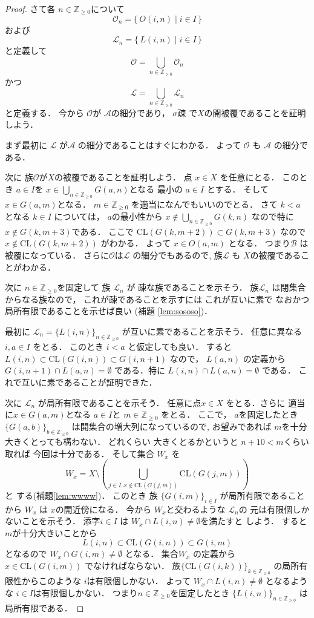 \documentclass[leqno, a4paper, 12pt]{jsarticle}
\newcommand{\zz}{\mathbb{Z}}
\newcommand{\cl}{\mathrm{CL}}
\begin{document}
\begin{proof}
さて各
$n\in \zz_{\ge 0}$について
\[
\mathcal{O}_{n}=\{\, O(i, n)\mid i\in I\, \}
\]
および
\[
\mathcal{L}_{n}=\{\, L(i, n)\mid i\in I\, \}
\]
と定義して
\[
\mathcal{O}=\bigcup_{n\in \zz_{\ge 0}}\mathcal{O}_{n}
\]
かつ
\[
\mathcal{L}=\bigcup_{n\in \zz_{\ge 0}}\mathcal{L}_{n}
\]
と定義する．
今から
$\mathcal{O}$が
$\mathcal{A}$の細分であり，
$\sigma$疎
で$X$の開被覆であることを証明しよう．

まず最初に
$\mathcal{L}$
が$\mathcal{A}$
の細分であることはすぐにわかる．
よって
$\mathcal{O}$
も
$\mathcal{A}$
の細分である．

次に
族$\mathcal{O}$が$X$の被覆であることを証明しよう．
点
$x\in X$
を任意にとる．
このとき
$a\in I$を
$x\in \bigcup_{n\in \zz_{\ge 0}}G(a, n)$となる
最小の
$a\in I$
とする．
そして
$x\in G(a, m)$となる．
$m\in \zz_{\ge 0}$
を適当になんでもいいのでとる．
さて
$k<a$
となる
$k\in I$
については，
$a$の最小性から
$x\not\in \bigcup_{n\in \zz_{\ge 0}}G(k, n)$
なので特に
$x\not \in G(k, m+3)$である．
ここで
$\cl(G(k, m+2))\subset G(k, m+3)$
なので
$x\not \in \cl(G(k, m+2))$
がわかる．
よって
$x\in O(a, m)$
となる．
つまり$\mathcal{B}$
は被覆になっている．
さらに$\mathcal{O}$は$\mathcal{L}$
の細分でもあるので,
族$\mathcal{L}$
も
$X$の被覆であることがわかる．

次に
$n\in \zz_{\ge 0}$を固定して
族
$\mathcal{L}_{n}$
が
疎な族であることを示そう．
族$\mathcal{L}_{n}$
は閉集合からなる族なので，
これが疎であることを示すには
これが互いに素で
なおかつ
局所有限であることを示せば良い
(補題
\ref{lem:sososo})．

最初に
$\mathcal{L}_{n}=\{L(i, n)\}_{n\in \zz_{\ge 0}}$
が互いに素であることを示そう．
任意に異なる
$i, a\in I$
をとる．
このとき
$i<a$
と仮定しても良い．
すると
$L(i, n)\subset \cl(G(i, n)) \subset G(i, n+1)$
なので，
$L(a, n)$
の定義から
$G(i, n+1)\cap L(a, n)=\emptyset$
である．特に
$L(i, n)\cap L(a, n)=\emptyset$
である．
これで互いに素であることが証明できた．

次に
$\mathcal{L}_{n}$
が局所有限であることを示そう．
任意に点$x\in X$
をとる．さらに
適当に$x\in G(a, m)$となる
$a\in I$と
$m\in \zz_{\ge 0}$
をとる．
ここで，
$a$を固定したとき
$\{G(a, b)\}_{b\in \zz_{\ge 0}}$
は開集合の増大列になっているので,
お望みであれば
$m$を十分大きくとっても構わない．
どれくらい
大きくとるかというと
$n+10<m$くらい取れば
今回は十分である．
そして集合
$W_{x}$
を
\[
W_{x}=X\setminus \left(\bigcup_{j\in I, x\not\in \cl(G(j, m))}
\cl(G(j, m))\right)
\]
と
する(補題\ref{lem:wwww})．
このとき
族
$\{G(i, m)\}_{i\in I}$
が局所有限であることから
$W_{x}$
は
$x$の開近傍になる．
今から
$W_{x}$と交わるような
$\mathcal{L}_{n}$の
元は有限個しかないことを示そう．
添字$i\in I$
は
$W_{x}\cap L(i, n)\neq \emptyset$を満たすと
しよう．
すると
$m$が十分大きいことから
\[
L(i, n)\subset\cl(G(i, n))\subset  G(i, m)
\]
となるので
$W_{x}\cap G(i, m)\neq \emptyset$
となる．
集合$W_{x}$
の定義から
$x\in \cl(G(i, m))$
でなければならない．
族$\{\cl(G(i, k))\}_{k\in \zz_{\ge 0}}$
の局所有限性からこのような
$i$は有限個しかない．
よって
$W_{x}\cap L(i, n)\neq \emptyset$
となるような
$i\in I$は有限個しかない．
つまり$n\in \zz_{\ge 0}$を固定したとき
$\{L(i, n)\}_{n\in \zz_{\ge 0}}$
は局所有限である．


\end{proof}
\end{document}
